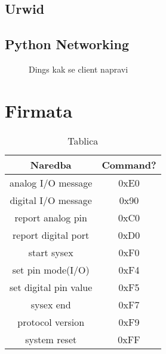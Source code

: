 \subsection{Urwid}

\subsection{Python Networking}

\begin{figure}[h]
\centering
{}
\caption{Dings kak se client napravi}
\end{figure}

\newpage
\section{Firmata}

\begin{table}[h]
\centering
    \begin{tabular}{|c|c|}
        \hline
        Naredba               & Command? \\
        \hline
        analog I/O message    & 0xE0 \\
        \hline
        digital I/O message   & 0x90 \\
        \hline
        report analog pin     & 0xC0 \\
        \hline
        report digital port   & 0xD0 \\
        \hline
        start sysex           & 0xF0 \\
        \hline
        set pin mode(I/O)     & 0xF4 \\
        \hline
        set digital pin value & 0xF5 \\
        \hline
        sysex end             & 0xF7 \\
        \hline
        protocol version      & 0xF9 \\
        \hline
        system reset          & 0xFF \\
        \hline
    \end{tabular}
    \caption{Tablica}
\end{table}


